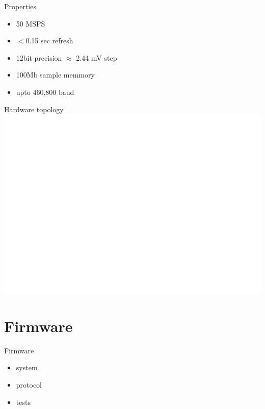 \documentclass{beamer}
\begin{document}
%	

	\begin{frame}{Properties}
		\begin{itemize}
			\item 50 MSPS
			\item $<$0.15 sec refresh
			\item 12bit precision $\approx$ 2.44 mV step
			\item 100Mb sample memmory
			\item upto 460,800 baud
		\end{itemize}
	\end{frame}	

	\begin{frame}{Hardware topology}
		\includegraphics[width=0.9\paperwidth]{Topology.png}
	\end{frame}


\section{Firmware}

	\begin{frame}{Firmware}
		\begin{itemize}
			\item system
			\item protocol
			\item tests
		\end{itemize}
	\end{frame}
\end{document}
